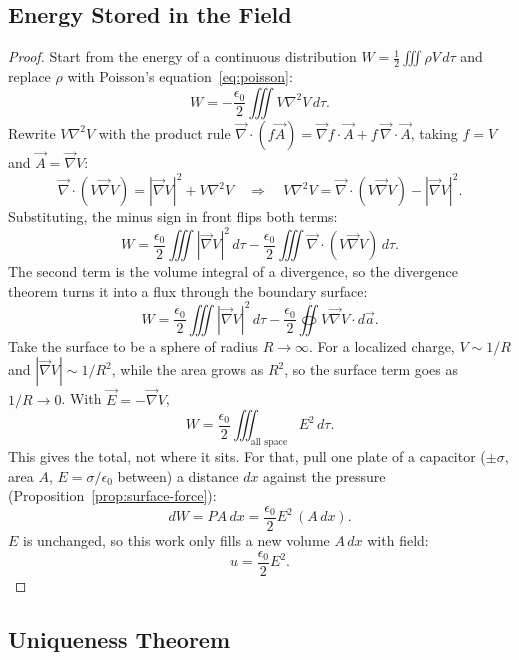 \documentclass{article}
\begin{document}
\subsection{Energy Stored in the Field}
\label{proof:esintf}
\begin{proof}
    Start from the energy of a continuous distribution $W = \frac{1}{2}\iiint\rho V\,d\tau$ and replace $\rho$ with Poisson's equation~\eqref{eq:poisson}:
    \[W = -\frac{\epsilon_0}{2}\iiint V\nabla^2 V\,d\tau.\]
    Rewrite $V\nabla^2 V$ with the product rule $\vec{\nabla}\cdot(f\vec{A}) = \vec{\nabla}f\cdot\vec{A} + f\,\vec{\nabla}\cdot\vec{A}$, taking $f = V$ and $\vec{A} = \vec{\nabla}V$:
    \[\vec{\nabla}\cdot(V\vec{\nabla}V) = |\vec{\nabla}V|^2 + V\nabla^2 V \quad\Longrightarrow\quad V\nabla^2 V = \vec{\nabla}\cdot(V\vec{\nabla}V) - |\vec{\nabla}V|^2.\]
    Substituting, the minus sign in front flips both terms:
    \[W = \frac{\epsilon_0}{2}\iiint|\vec{\nabla}V|^2\,d\tau - \frac{\epsilon_0}{2}\iiint\vec{\nabla}\cdot(V\vec{\nabla}V)\,d\tau.\]
    The second term is the volume integral of a divergence, so the divergence theorem turns it into a flux through the boundary surface:
    \[W = \frac{\epsilon_0}{2}\iiint|\vec{\nabla}V|^2\,d\tau - \frac{\epsilon_0}{2}\oiint V\vec{\nabla}V\cdot d\vec{a}.\]
    Take the surface to be a sphere of radius $R \to \infty$. For a localized charge, $V \sim 1/R$ and $|\vec{\nabla}V| \sim 1/R^2$, while the area grows as $R^2$, so the surface term goes as $1/R \to 0$. With $\vec{E} = -\vec{\nabla}V$,
    \[W = \frac{\epsilon_0}{2}\iiint_{\text{all space}} E^2\,d\tau.\]
    This gives the total, not where it sits. For that, pull one plate of a capacitor ($\pm\sigma$, area $A$, $E = \sigma/\epsilon_0$ between) a distance $dx$ against the pressure (Proposition~\ref{prop:surface-force}):
    \[dW = PA\,dx = \frac{\epsilon_0}{2}E^2\,(A\,dx).\]
    $E$ is unchanged, so this work only fills a new volume $A\,dx$ with field:
    \[u = \frac{\epsilon_0}{2}E^2.\]
\end{proof}

\subsection{Uniqueness Theorem}
\end{document}
